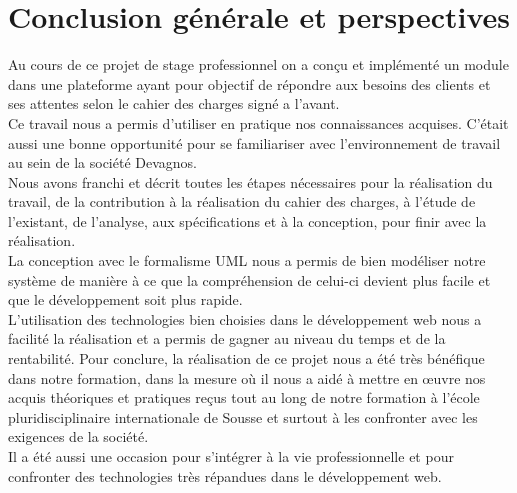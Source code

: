\documentclass[a4paper,10pt]{book}
\begin{document}
\section*{ Conclusion générale et perspectives }
Au cours de ce projet de stage professionnel on a conçu et implémenté un module dans une plateforme ayant pour objectif de répondre aux besoins des clients et ses attentes selon le cahier des charges signé a l’avant. \\
 Ce travail nous a permis d’utiliser en pratique nos connaissances acquises. C’était aussi une bonne opportunité  pour se familiariser avec l’environnement de travail au sein de la société Devagnos. 
\\
    Nous avons franchi et décrit toutes les étapes nécessaires pour la réalisation du travail, de la contribution à la réalisation du cahier des charges, à l’étude de l’existant, de l’analyse, aux spécifications et à la conception, pour finir avec la réalisation. \\
      La conception  avec le formalisme UML nous a permis de bien modéliser notre système de manière à ce que la compréhension de celui-ci devient plus facile et que le développement soit plus rapide.  \\
          L’utilisation des technologies bien choisies dans le développement web  nous a facilité la réalisation et a permis de gagner au niveau du temps et de la rentabilité. Pour conclure, la réalisation de ce projet nous a été très bénéfique dans notre formation, dans la mesure où il nous a aidé à mettre en œuvre nos acquis théoriques et pratiques reçus tout au long de notre formation à l’école pluridisciplinaire internationale de Sousse et surtout à les confronter avec les exigences de la société.  \\
          Il a été aussi une occasion pour s’intégrer à la vie professionnelle et pour confronter des technologies très répandues dans le développement web. 

\medskip
 
\printbibliography
\end{document}
